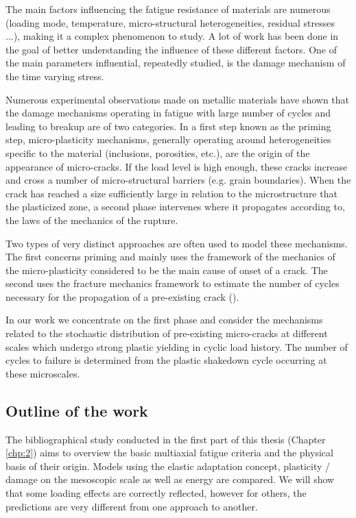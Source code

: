 The main factors influencing the fatigue resistance of materials are  numerous
(loading mode, temperature, micro-structural heterogeneities, residual stresses ...),
making it a complex phenomenon to study. A lot of work has been done in the goal of
better understanding the influence of these different factors. One of the main parameters
influential, repeatedly studied, is the damage mechanism of the time varying stress.

Numerous experimental observations made on metallic materials have shown
that the damage mechanisms operating in fatigue with large number of cycles and
leading to breakup are of two categories. In a first step known as the priming step,
micro-plasticity mechanisms, generally operating around heterogeneities specific to the
material (inclusions, porosities, etc.), are the origin of the appearance of micro-cracks. If the load level is high enough, these cracks increase and cross a number of micro-structural barriers (e.g. grain boundaries). When the crack has reached a size
sufficiently large in relation to the microstructure that the plasticized zone, a second phase intervenes where it propagates according to, the laws of the mechanics of the rupture.

Two types of very distinct approaches are often used to model these mechanisms. The
first concerns priming and mainly uses the framework of the mechanics of the
micro-plasticity considered to be the main cause of onset
of a crack. The second uses the fracture mechanics framework to estimate the number
of cycles necessary for the propagation of a pre-existing crack (\cite{koutiri2011effet}). 

In our work we concentrate on the first phase and consider the mechanisms related to the stochastic distribution of pre-existing micro-cracks at different scales which undergo strong plastic yielding in cyclic load history. The number of cycles to failure is determined from the plastic shakedown cycle occurring at these microscales.

\subsection{Outline of the work}
The bibliographical study conducted in the first part of this thesis  (Chapter \ref{chp:2}) aims to
overview the basic multiaxial fatigue criteria and the physical basis of their origin. Models using the elastic adaptation concept, plasticity / damage on the mesoscopic scale as well as energy
are compared. We will show that some loading effects are correctly reflected, however for others, the predictions are very different from one approach to another.

